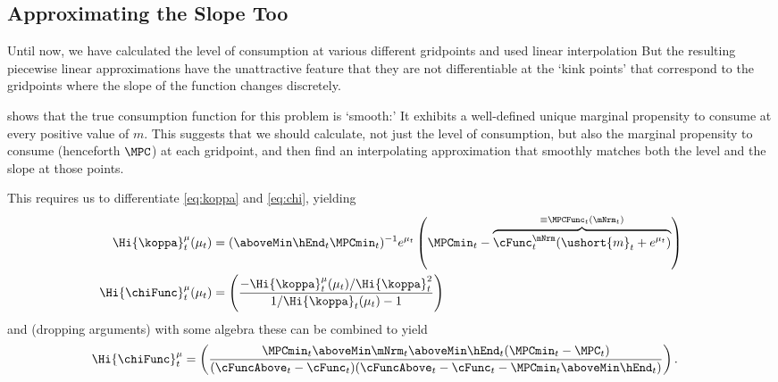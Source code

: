 \documentclass[titlepage, headings=optiontotocandhead]{\econtex}
\begin{document}
\subsection{Approximating the Slope Too}


Until now, we have calculated the level of consumption at
various different gridpoints and used linear interpolation  But the
resulting piecewise linear approximations have the unattractive feature
that they are not differentiable at the `kink points' that correspond to
the gridpoints where the slope of the function changes discretely.



\cite{BufferStockTheory} shows that the true consumption function for
this problem 
is `smooth:' It
exhibits a well-defined unique marginal propensity to consume at every
positive value of ${m}$.  This suggests that we should calculate, not
just the level of consumption, but also the marginal propensity to
consume (henceforth $\MPC$) at each gridpoint, and then find an
interpolating approximation that smoothly matches both the level and the slope
at those points.

This requires us to differentiate \eqref{eq:koppa} and \eqref{eq:chi}, yielding
\begin{equation}\begin{gathered}\begin{aligned}
      \Hi{\koppa}_{t}^{\mu}(\mu_{t})   & = (\aboveMin \hEnd_{t} \MPCmin_{t})^{-1}e^{\mu_{t}}\left(\MPCmin_{t}-\overbrace{\cFunc^{\mNrm}_{t}(\ushort{m}_{t}+e^{\mu_{t}})}^{\equiv \MPCFunc_{t}(\mNrm_{t})}\right)  \label{eq:koppaPrime}
      \\ \Hi{\chiFunc}_{t}^{\mu}(\mu_{t})  & = \left(\frac{-\Hi{\koppa}_{t}^{\mu}(\mu_{t})/\Hi{\koppa}_{t}^{2}}{1/\Hi{\koppa}_{t}(\mu_{t})-1}\right)
    \end{aligned}\end{gathered}\end{equation}
and (dropping arguments) with some algebra these can be combined to yield
\begin{equation}\begin{gathered}\begin{aligned}
      \Hi{\chiFunc}_{t}^{\mu}  & = \left(\frac{\MPCmin_{t} \aboveMin \mNrm_{t} \aboveMin \hEnd_{t} (\MPCmin_{t}-\MPC_{t})}
        {(\cFuncAbove_{t}-\cFunc_{t})(\cFuncAbove_{t}-\cFunc_{t} - \MPCmin_{t} \aboveMin \hEnd_{t})}\right).
    \end{aligned}\end{gathered}\end{equation}
\end{document}
